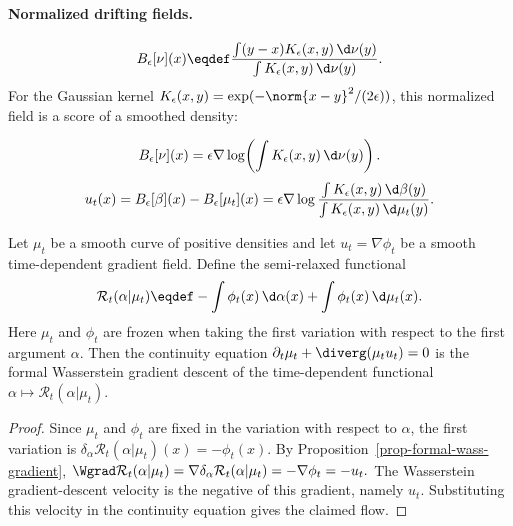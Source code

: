 \paragraph{Normalized drifting fields.}
\begin{equation}\label{eq-normalized-kernel-drift}
B_\epsilon[\nu](x)
\eqdef
\frac{\int (y-x)K_\epsilon(x,y)\,\d\nu(y)}
{\int K_\epsilon(x,y)\,\d\nu(y)}.
\end{equation}
For the Gaussian kernel $K_\epsilon(x,y)=\exp(-\norm{x-y}^2/(2\epsilon))$, this normalized field is a score of a smoothed density:

\begin{equation}\label{eq-normalized-kernel-score}
B_\epsilon[\nu](x)
=
\epsilon\nabla\log\!\left(\int K_\epsilon(x,y)\,\d\nu(y)\right).
\end{equation}
\begin{equation}\label{eq-cross-minus-self-drift}
u_t(x)=B_\epsilon[\beta](x)-B_\epsilon[\mu_t](x)
=
\epsilon\nabla\log
\frac{\int K_\epsilon(x,y)\,\d\beta(y)}
{\int K_\epsilon(x,y)\,\d\mu_t(y)}.
\end{equation}
\begin{prop}\label{prop-drifting-semi-relaxed-gradient}
Let $\mu_t$ be a smooth curve of positive densities and let $u_t=\nabla\phi_t$ be a smooth time-dependent gradient field. Define the semi-relaxed functional
\begin{equation}\label{eq-semi-relaxed-drift-functional}
\mathcal R_t(\alpha|\mu_t)
\eqdef
-\int \phi_t(x)\,\d\alpha(x)
+\int \phi_t(x)\,\d\mu_t(x).
\end{equation}
Here $\mu_t$ and $\phi_t$ are frozen when taking the first variation with respect to the first argument $\alpha$. Then the continuity equation
\(\partial_t\mu_t+\diverg(\mu_t u_t)=0\)
is the formal Wasserstein gradient descent of the time-dependent functional $\alpha\mapsto\mathcal R_t(\alpha|\mu_t)$.
\end{prop}
\begin{proof}
Since $\mu_t$ and $\phi_t$ are fixed in the variation with respect to $\alpha$, the first variation is \(\delta_\alpha \mathcal R_t(\alpha|\mu_t)(x)=-\phi_t(x).\)
By Proposition~\ref{prop-formal-wass-gradient}, \(\Wgrad \mathcal R_t(\alpha|\mu_t) = \nabla\delta_\alpha \mathcal R_t(\alpha|\mu_t) = -\nabla\phi_t = -u_t.\)
The Wasserstein gradient-descent velocity is the negative of this gradient, namely $u_t$. Substituting this velocity in the continuity equation gives the claimed flow.
\end{proof}
